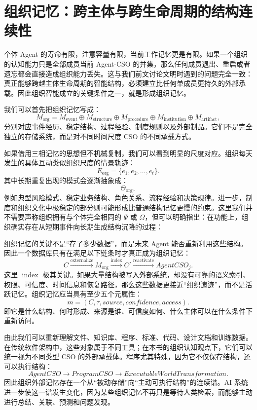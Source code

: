 \section{组织记忆：跨主体与跨生命周期的结构连续性}
\label{sec:organizational-memory}

个体 Agent 的寿命有限，注意容量有限，当前工作记忆更是有限。如果一个组织的认知能力只是全部成员当前 Agent-CSO 的并集，那么任何成员退出、重启或者遗忘都会直接造成组织能力丢失。这与我们前文讨论文明时遇到的问题完全一致：真正能够跨越主体生命周期的智能结构，必须建立比任何单成员更持久的外部承载。因此组织智能成立的关键条件之一，就是形成组织记忆。

我们可以首先把组织记忆写成：
\[
M_{\mathrm{org}}
=
M_{\mathrm{event}}
\oplus
M_{\mathrm{structure}}
\oplus
M_{\mathrm{procedure}}
\oplus
M_{\mathrm{institution}}
\oplus
M_{\mathrm{artifact}},
\]
分别对应事件经历、稳定结构、过程经验、制度规则以及外部制品。它们不是完全独立的存储系统，而是对不同时间尺度 CSO 的不同承载方式。

如果借用三相记忆的思想但不机械复制，我们可以看到明显的尺度对应。组织每天发生的具体互动类似组织尺度的情景轨迹：
\[
E_{\mathrm{org}}
=
\{e_1,e_2,\ldots,e_t\}.
\]
其中长期重复出现的模式会逐渐抽象成：
\[
\Theta_{\mathrm{org}},
\]
例如典型风险模式、稳定业务结构、角色关系、流程经验和决策规律。进一步，制度和组织文化中极稳定的部分则可能形成比普通结构记忆更慢的约束。这里我们并不需要声称组织拥有与个体完全相同的 $\Psi$ 或 $\Omega$，但可以明确指出：在功能上，组织确实存在从短期事件向长期生成结构沉降的过程：
\begin{statementbox}
\centering
{}
\end{statementbox}

组织记忆的关键不是“存了多少数据”，而是未来 Agent 能否重新利用这些结构。因此一个数据库只有在满足以下链条时才真正成为组织记忆：
\[
C
\xrightarrow{\operatorname{externalize}}
M_{\mathrm{org}}
\xrightarrow{\operatorname{index}}
C'
\xrightarrow{\operatorname{reactivate}}
AgentCSO_j.
\]
这里 $\operatorname{index}$ 极其关键。如果大量结构被写入外部系统，却没有可靠的语义索引、权限、可信度、时间信息和恢复路径，那么这些数据更接近“组织遗迹”，而不是活跃记忆。组织记忆应当具有至少五个元属性：
\[
m=
(C,\tau,source,confidence,access).
\]
即它是什么结构、何时形成、来源是谁、可信度如何、什么主体可以在什么条件下重新访问。

由此我们可以重新理解文件、知识库、程序、标准、代码、设计文档和训练数据。在传统软件架构中，这些对象属于不同工具；在本书的组织认知观点下，它们可以统一视为不同类型 CSO 的外部承载体。程序尤其特殊，因为它不仅保存结构，还可以执行结构：
\[
AgentCSO
\rightarrow
ProgramCSO
\rightarrow
ExecutableWorldTransformation.
\]
因此组织外部记忆存在一个从“被动存储”向“主动可执行结构”的连续谱。AI 系统进一步使这一谱发生变化，因为某些组织记忆不再只是等待人类检索，而能够主动进行总结、关联、预测和问题发现。


